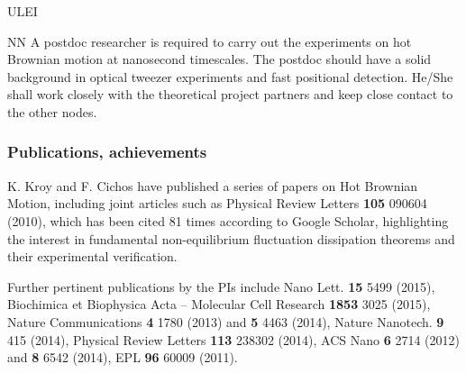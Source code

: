 \begin{sitedescription}{ULEI}
\begin{participant}[type=res,PM=36,salary=5500]{NN}
A postdoc researcher is required to carry out the experiments on hot Brownian motion at nanosecond timescales. The postdoc should have a solid background in optical tweezer experiments and fast positional detection. He/She shall work closely with the theoretical project partners and keep close contact to the other nodes.
\end{participant}

\subsubsection*{Publications, achievements}

\begin{compactenum}
\item K. Kroy and F. Cichos have published a series of papers on Hot Brownian Motion, including joint articles such as 
Physical Review Letters {\bf 105} 090604 (2010), which has been cited 81 times according to Google Scholar, 
highlighting the interest in fundamental non-equilibrium fluctuation dissipation theorems and their experimental verification.

\item Further pertinent publications by the PIs include Nano Lett. {\bf 15} 5499 (2015), 
Biochimica et Biophysica Acta -- Molecular Cell Research {\bf 1853} 3025 (2015),
Nature Communications {\bf 4} 1780 (2013) and {\bf 5} 4463 (2014),
Nature Nanotech. {\bf 9} 415 (2014), Physical Review Letters {\bf 113} 238302 (2014), 
ACS Nano {\bf 6} 2714 (2012) and {\bf 8} 6542 (2014), EPL {\bf 96} 60009 (2011).






\end{compactenum}
\end{sitedescription}
